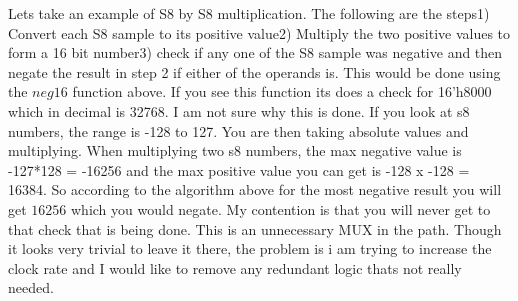 Lets take an example of S8 by S8 multiplication. The following are the steps1) Convert each S8 sample to its positive value2) Multiply the two positive values to form a 16 bit number3) check if any one of the S8 sample was negative and then negate the result in step 2 if either of the operands is. This would be done using the $neg16$ function above.
If you see this function its does a check for 16'h8000 which in decimal is 32768. I am not sure why this is done. If you look at s8 numbers, the range is -128 to 127. You are then taking absolute values and multiplying. When multiplying two s8 numbers, the max negative value is -127*128 = -16256 and the max positive value you can get is -128 x -128 = 16384. So according to the algorithm above for the most negative result you will get $16256$ which you would negate. My contention is that you will never get to that check that is being done. This is an unnecessary MUX in the path. Though it looks very trivial to leave it there, the problem is i am trying to increase the clock rate and I would like to remove any redundant logic thats not really needed. 




























\newpage
 \printbibliography

